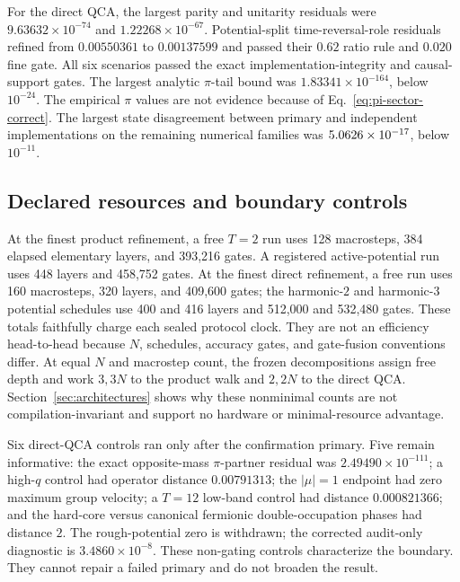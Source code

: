 For the direct QCA, the largest parity and unitarity residuals were
$9.63632\times10^{-74}$ and $1.22268\times10^{-67}$.  Potential-split
time-reversal-role residuals refined from $0.00550361$ to $0.00137599$ and
passed their $0.62$ ratio rule and $0.020$ fine gate.  All six scenarios passed
the exact implementation-integrity and causal-support gates.  The largest
analytic $\pi$-tail bound was $1.83341\times10^{-164}$, below $10^{-24}$.
The empirical $\pi$ values are not evidence because of
Eq.~\eqref{eq:pi-sector-correct}.  The largest state disagreement between
primary and independent implementations on the remaining numerical families
was $5.0626\times 10^{-17}$, below $10^{-11}$.

\subsection{Declared resources and boundary controls}

At the finest product refinement, a free $T=2$ run uses 128 macrosteps, 384
elapsed elementary layers, and 393,216 gates.  A registered active-potential
run uses 448 layers and 458,752 gates.  At the finest direct refinement, a
free run uses 160 macrosteps, 320 layers, and 409,600 gates; the harmonic-$2$
and harmonic-$3$ potential schedules use 400 and 416 layers and 512,000 and
532,480 gates.  These totals faithfully charge each sealed protocol clock.
They are not an efficiency head-to-head because $N$, schedules, accuracy gates,
and gate-fusion conventions differ.  At equal $N$ and macrostep count, the
frozen decompositions assign free depth and work $3,3N$ to the product walk and
$2,2N$ to the direct QCA.  Section~\ref{sec:architectures} shows why these
nonminimal counts are not compilation-invariant and support no hardware or
minimal-resource advantage.

Six direct-QCA controls ran only after the confirmation primary.  Five remain
informative: the exact
opposite-mass $\pi$-partner residual was $2.49490\times10^{-111}$; a high-$q$
control had operator distance $0.00791313$; the $|\mu|=1$ endpoint had zero
maximum group velocity; a $T=12$ low-band control had distance
$0.000821366$; and the hard-core versus canonical fermionic
double-occupation phases had distance $2$.  The rough-potential zero is
withdrawn; the corrected audit-only diagnostic is $3.4860\times10^{-8}$.
These non-gating controls characterize the boundary.  They cannot repair a
failed primary and do not broaden the result.
